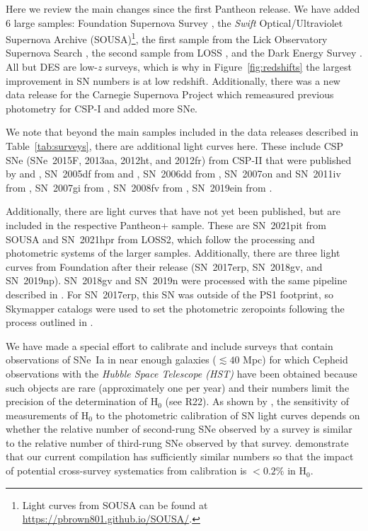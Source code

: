 \documentclass[twocolumn]{aastex63}
\begin{document}
Here we review the main changes since the first Pantheon release.  We have added 6 large samples: Foundation Supernova Survey \citep[Foundation;][]{Foley2018}, the {\it Swift} Optical/Ultraviolet Supernova Archive (SOUSA)\footnote{Light curves from SOUSA can be found at \url{https://pbrown801.github.io/SOUSA/}.}, the first sample from the Lick Observatory Supernova Search  \citep[LOSS1;][]{Ganeshalingam2010}, the second sample from LOSS \citep[LOSS2;][]{Stahl2019}, and the Dark Energy Survey \cite[DES;][]{Brout19}.  All but DES are low-$z$ surveys, which is why in  Figure~\ref{fig:redshifts} the largest improvement in SN numbers is at low redshift. Additionally, there was a new data release for the Carnegie Supernova Project \citep[CSP;][]{Krisciunas2017} which remeasured previous photometry for CSP-I and added more SNe. 

We note that beyond the main samples included in the data releases described in Table~\ref{tab:surveys}, there are additional light curves here.  These include CSP SNe (SNe~2015F, 2013aa, 2012ht, and 2012fr) from CSP-II that were published by \cite{Burns18} and \cite{Burns20}, SN~2005df from \cite{Milne10} and \cite{Kris2017_df}, SN~2006dd from \cite{Stritzinger10}, SN~2007on and SN~2011iv from \cite{Gall2018}, SN~2007gi from \cite{Zhang10}, SN~2008fv from 
\cite{Tsvetkov10}, SN~2019ein from \cite{Kawabata20}.

Additionally, there are light curves that have not yet been published, but are included in the respective Pantheon+ sample.  These are SN~2021pit from SOUSA and SN~2021hpr from LOSS2, which follow the processing and photometric systems of the larger samples.  Additionally, there are three light curves from Foundation after their release (SN~2017erp, SN~2018gv, and SN~2019np).  SN~2018gv and SN~2019n were processed with the same pipeline described in \cite{Foley2018}.  For SN~2017erp, this SN was outside of the PS1 footprint, so Skymapper catalogs \citep{Onken19} were used to set the photometric zeropoints following the process outlined in \cite{Scolnic2015}.


We have made a special effort to calibrate and include surveys that contain observations of  SNe~Ia in near enough galaxies ($\lesssim40$ Mpc) for which Cepheid observations with the {\it Hubble Space Telescope (HST)} have been obtained because such objects are rare (approximately one per year) and their numbers limit the precision of the determination of H$_0$ (see R22).  As shown by \cite{Brownsberger21}, the sensitivity of measurements of H$_0$ to the photometric calibration of SN light curves depends on whether the relative number of second-rung SNe observed by a survey is similar to the relative number of third-rung SNe observed by that survey.  \cite{Brownsberger21} demonstrate that our current compilation has sufficiently similar numbers so that the impact of potential cross-survey systematics from calibration is $<0.2\%$ in H$_0$.
\end{document}
